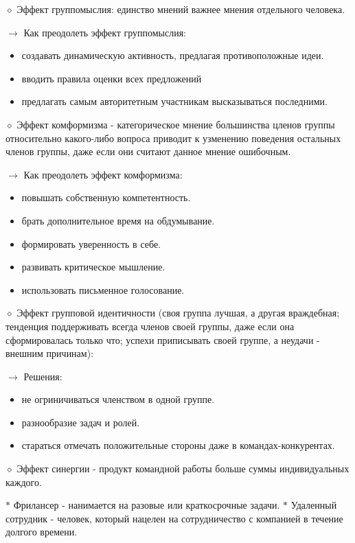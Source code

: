 \documentclass[12pt,a4paper]{report}
\begin{document}
\bigskip
$\diamond$ Эффект группомыслия: единство мнений важнее мнения отдельного человека.

\medskip 
$\rightarrow$ Как преодолеть эффект группомыслия:
\begin{itemize}
	\item создавать динамическую активность, предлагая противоположные идеи.
	\item вводить правила оценки всех предложений 
	\item предлагать самым авторитетным участникам высказываться последними.
\end{itemize}

\bigskip
$\diamond$ Эффект комформизма - категорическое мнение большинства цленов группы относительно какого-либо вопроса приводит к узменению поведения остальных членов группы, даже если они считают данное мнение ошибочным.

\newpage
\medskip 
$\rightarrow$ Как преодолеть эффект комформизма:
\begin{itemize}
	\item повышать собственную компетентность.
	\item брать дополнительное время на обдумывание.
	\item формировать уверенность в себе.
	\item развивать критическое мышление.
	\item использовать письменное голосование.
\end{itemize}

\bigskip 
$\diamond$ Эффект групповой идентичности (своя группа лучшая, а другая враждебная; тенденция поддерживать всегда членов своей группы, даже если она сформировалась только что; успехи приписывать своей группе, а неудачи - внешним причинам):

\medskip
$\rightarrow$ Решения:
\begin{itemize}
	\item не огриничиваться членством в одной группе.
	\item разнообразие задач и ролей.
	\item стараться отмечать положительные стороны даже в командах-конкурентах.
\end{itemize}

\bigskip
$\diamond$  Эффект синергии - продукт командной работы больше суммы индивидуальных каждого.

\bigskip\smallskip 
$\ast$ Фрилансер - нанимается на разовые или краткосрочные задачи.
\medspace
$\ast$ Удаленный сотрудник - человек, который нацелен на сотрудничество с компанией в течение долгого времени.
\end{document}

